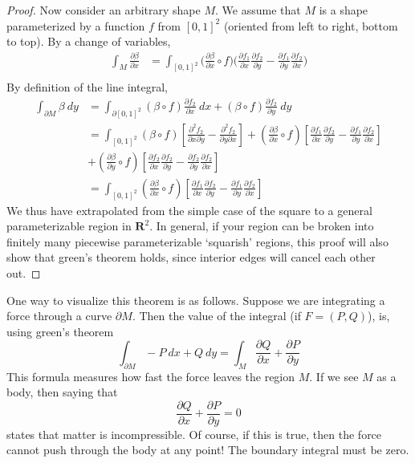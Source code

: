 \documentclass[12pt]{amsbook}
\theoremstyle{plain}
\theoremstyle{definition}
\begin{document}
\begin{proof}
    Now consider an arbitrary shape $M$. We assume that $M$ is a shape parameterized by a function $f$ from $[0,1]^2$ (oriented from left to right, bottom to top). By a change of variables,
    \begin{align*}
        \int_M \frac{\partial \beta}{\partial x} &= \int_{[0,1]^2} \bigg( \frac{\partial \beta}{\partial x} \circ f \bigg) \bigg( \frac{\partial f_1}{\partial x} \frac{\partial f_2}{\partial y} - \frac{\partial f_1}{\partial y} \frac{\partial f_2}{\partial x} \bigg)\\
    \end{align*}
    By definition of the line integral,
%
\begin{align*}
\int_{\partial M} \beta\ dy &= \int_{\partial [0,1]^2} (\beta \circ f) \frac{\partial f_2}{\partial x}\ dx + (\beta \circ f) \frac{\partial f_2}{\partial y}\ dy\\
&= \int_{[0,1]^2} (\beta \circ f) \left[\frac{\partial^2 f_2}{\partial x  \partial y} - \frac{\partial^2 f_2}{\partial y \partial x}\right] + \left( \frac{\partial \beta}{\partial x} \circ f \right) \left[ \frac{\partial f_1}{\partial x} \frac{\partial f_2}{\partial y} - \frac{\partial f_1}{\partial y} \frac{\partial f_2}{\partial x}\right]\\
&+ \left( \frac{\partial \beta}{\partial y} \circ f \right) \left[ \frac{\partial f_2}{\partial x} \frac{\partial f_2}{\partial y} - \frac{\partial f_2}{\partial y} \frac{\partial f_2}{\partial x} \right]\\
&= \int_{[0,1]^2} \left( \frac{\partial \beta}{\partial x} \circ f \right) \left[ \frac{\partial f_1}{\partial x} \frac{\partial f_2}{\partial y} - \frac{\partial f_1}{\partial y} \frac{\partial f_2}{\partial x}\right]
\end{align*}
%
    We thus have extrapolated from the simple case of the square to a general parameterizable region in $\mathbf{R}^2$. In general, if your region can be broken into finitely many piecewise parameterizable `squarish' regions, this proof will also show that green's theorem holds, since interior edges will cancel each other out.
\end{proof}

One way to visualize this theorem is as follows. Suppose we are integrating a force through a curve $\partial M$. Then the value of the integral (if $F = (P,Q)$), is, using green's theorem
%
\[ \int_{\partial M} -P\ dx + Q\ dy = \int_M \frac{\partial Q}{\partial x} + \frac{\partial P}{\partial y} \]
%
This formula measures how fast the force leaves the region $M$. If we see $M$ as a body, then saying that
\[ \frac{\partial Q}{\partial x} + \frac{\partial P}{\partial y} = 0 \]
%
states that matter is incompressible. Of course, if this is true, then the force cannot push through the body at any point! The boundary integral must be zero.
\end{document}
